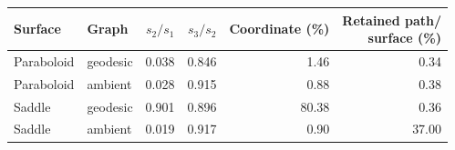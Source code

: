 \begin{tabular}{llrrrr}
\toprule
Surface & Graph & $s_2/s_1$ & $s_3/s_2$ & Coordinate (\%) & \shortstack{Retained path/\\surface (\%)}\\
\midrule
Paraboloid & geodesic & 0.038 & 0.846 & 1.46 & 0.34\\
Paraboloid & ambient & 0.028 & 0.915 & 0.88 & 0.38\\
Saddle & geodesic & 0.901 & 0.896 & 80.38 & 0.36\\
Saddle & ambient & 0.019 & 0.917 & 0.90 & 37.00\\
\bottomrule
\end{tabular}
